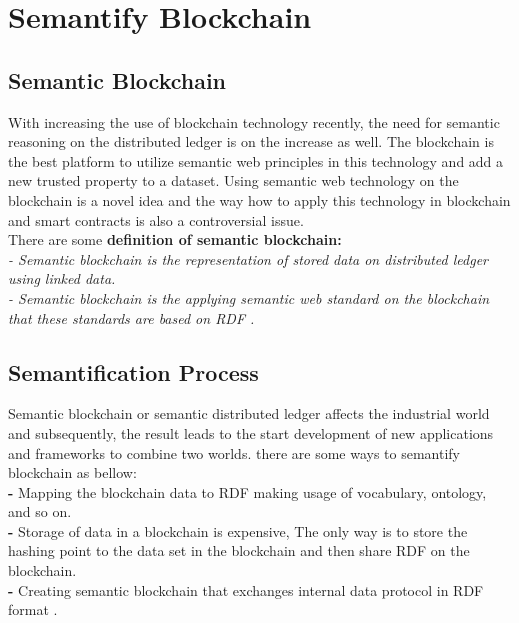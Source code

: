 \section{Semantify Blockchain}
\subsection{Semantic Blockchain}
With increasing the use of blockchain technology recently, the need for semantic reasoning on the distributed ledger is on the increase as well. The blockchain is the best platform to utilize semantic web principles in this technology and add a new trusted property to a dataset. 
Using semantic web technology on the blockchain is a novel idea and the way how to apply this technology in blockchain and smart contracts is also a controversial issue.\\
There are some \textbf{definition of semantic blockchain:}\\ 
\textit{- Semantic blockchain is the representation of stored data on distributed ledger using linked data. }\\
\textit{- Semantic blockchain is the applying semantic web standard on the blockchain that these standards are based on RDF \cite{Hector}.}
\subsection{Semantification Process}
Semantic blockchain or semantic distributed ledger affects the industrial world and subsequently, the result leads to the start development of new applications and frameworks to combine two worlds.
there are some ways to semantify blockchain as bellow:\\
\textbf{-} Mapping the blockchain data to RDF making usage of vocabulary, ontology, and so on. \\
\textbf{-} Storage of data in a blockchain is expensive, The only way is to store the hashing point to the data set in the blockchain and then share RDF on the blockchain. \\
\textbf{-} Creating semantic blockchain that exchanges internal data protocol in RDF format \cite{Hector}. \\
